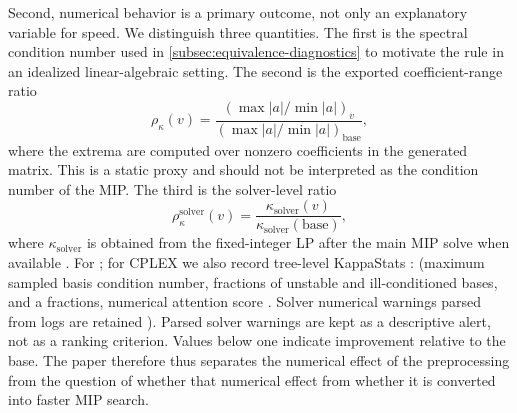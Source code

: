 \documentclass[AMA,Times1COL]{WileyNJDv5} %
\providecommand{\DIFadd}[1]{{\protect\color{blue} \sf #1}} %
\providecommand{\DIFdel}[1]{{\protect\color{red} \scriptsize #1}} %
\providecommand{\DIFaddbegin}{} %
\providecommand{\DIFaddend}{} %
\providecommand{\DIFdelbegin}{} %
\providecommand{\DIFdelend}{} %
\begin{document}
Second, numerical behavior is a primary outcome, not only an explanatory variable for
speed. We distinguish three quantities. The first is the spectral condition number used in
\cref{subsec:equivalence-diagnostics} to motivate the rule in an idealized linear-algebraic
setting. The second is the exported coefficient-range ratio
\begin{equation}
\rho_\kappa(v)=
\frac{(\max |a|/\min |a|)_v}{(\max |a|/\min |a|)_{\mathrm{base}}},
\label{eq:static-kappa-ratio}
\end{equation}
where the extrema are computed over nonzero coefficients in the generated matrix. This
is a static proxy and should not be interpreted as the condition number of the MIP. The
third is the solver-level ratio
\begin{equation}
\rho^{\mathrm{solver}}_\kappa(v)=
\frac{\kappa_{\mathrm{solver}}(v)}{\kappa_{\mathrm{solver}}(\mathrm{base})},
\label{eq:solver-kappa-ratio}
\end{equation}
where $\kappa_{\mathrm{solver}}$ is obtained from the fixed-integer LP after the main MIP
solve when available\DIFdelbegin \DIFdel{. For }\DIFdelend \DIFaddbegin \DIFadd{; for }\DIFaddend CPLEX we also record tree-level KappaStats \DIFdelbegin \DIFdel{: }\DIFdelend \DIFaddbegin \DIFadd{(}\DIFaddend maximum sampled basis
condition number, \DIFdelbegin \DIFdel{fractions of }\DIFdelend unstable and ill-conditioned \DIFdelbegin \DIFdel{bases, and a }\DIFdelend \DIFaddbegin \DIFadd{fractions, }\DIFaddend numerical attention score\DIFdelbegin \DIFdel{. Solver numerical warnings parsed from logs are retained }\DIFdelend \DIFaddbegin \DIFadd{). Parsed
solver warnings are kept }\DIFaddend as a descriptive alert, not \DIFdelbegin \DIFdel{as }\DIFdelend a ranking criterion. Values below one
indicate improvement relative to the base. The paper \DIFdelbegin \DIFdel{therefore }\DIFdelend \DIFaddbegin \DIFadd{thus }\DIFaddend separates the numerical effect \DIFdelbegin \DIFdel{of the preprocessing from
the
question of whether that numerical effect }\DIFdelend \DIFaddbegin \DIFadd{from
whether it }\DIFaddend is converted into faster MIP search.
\end{document}

